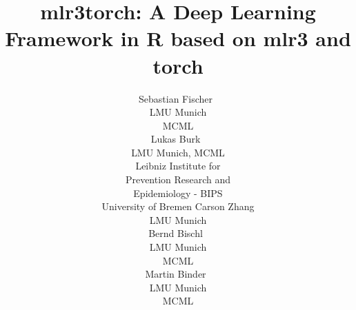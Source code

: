 \documentclass[article]{jss}
\author{Sebastian Fischer~\orcidlink{0000-0002-9609-3197} \\
    LMU Munich \\
    MCML \\
    \And Lukas Burk~\orcidlink{0000-0001-7528-3795} \\
    LMU Munich, MCML \\
    Leibniz Institute for\\Prevention Research and\\Epidemiology - BIPS \\
    University of Bremen
    \AND Carson Zhang \\
    LMU Munich \\
    \And Bernd Bischl~\orcidlink{0000-0001-6002-6980} \\
    LMU Munich \\
    MCML \\
    \And Martin Binder~\orcidlink{0009-0008-2578-2869} \\
    LMU Munich \\
    MCML \\
}
\title{mlr3torch: A Deep Learning Framework in R based on mlr3 and torch}
\theoremstyle{definition}
\begin{document}
\begin{comment}

Fullfilled:

\begin{itemize}
    \item Code distributed with JSS articles uses the GNU General Public License (GPL) version 2 or version 3 or a GPL-compatible license. JSS does NOT consider software distributed under other licenses.
\end{itemize}

Final submission:

\begin{itemize}
    \item [ ] british or american english?
    \item [ ] Size limit: Upload not more than 50 MB
    \item [ ] submission must contain: pdf manuscript, source code, replication materials
    \item [ ] the manuscript must be fully and exactly reproducible on at least one platform
    \item [ ] We need to provide a simplified version of the script reproducing the results that can run on a regular PC. (https://www.jstatsoft.org/authors#manuscript-preparation) -> maybe I can just run this on GitHub actions CI?
    \item [ ] to facilitate review, authors are strongly encouraged to provide an output file that shows the results from running the single standalone replication script so that this can be compared against the results presented in the manuscript. For R submissions, this should be done by providing a file "code.html" created by running knitr::spin("code.R") on the replication script "code.R" which should include a call to sessionInfo() at the end.
    \item [ ] Source code must be submitted in ASCII files (but need to read software preparation guidelines again after submission: https://www.jstatsoft.org/authors#manuscript-preparation)
    \item [ ] manuscript can be compiled using pdflatex
    \item [ ] Special naming for programming languages and journals (don't think it applies here)
    \item [ ] Ensure consistent <- over =
    \item [ ] Cite all datasets
    \item [ ] use proglang and pkg everywhere
    \item [ ] Check spelling for programming languages and libraries

\end{comment}
\end{document}
